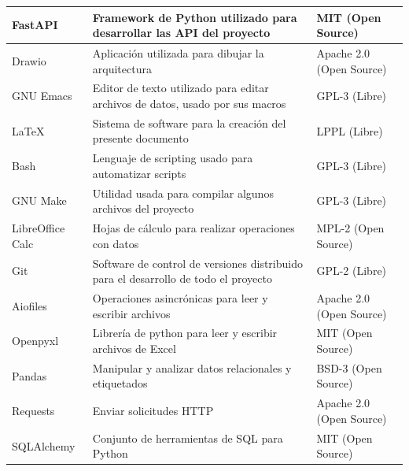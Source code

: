 \begin{longtable}{|p{}|p{}|p{}|}
  FastAPI & Framework de Python utilizado para desarrollar las \acs{API} del proyecto & MIT (Open Source)\cite{fastapi_license} \\ \hline

  Drawio & Aplicación utilizada para dibujar la arquitectura & Apache 2.0 (Open Source)\cite{drawio_license} \\ \hline

  GNU Emacs & Editor de texto utilizado para editar archivos de datos, usado por sus macros & GPL-3 (Libre)\cite{wiki_gnu_emacs} \\ \hline

  \LaTeX & Sistema de software para la creación del presente documento & LPPL (Libre)\cite{latex_lppl} \\ \hline

  Bash & Lenguaje de scripting usado para automatizar scripts & GPL-3 (Libre)\cite{wiki_bash_shell} \\ \hline

  GNU Make & Utilidad usada para compilar algunos archivos del proyecto & GPL-3 (Libre)\cite{gnu_make_manual} \\ \hline

  LibreOffice Calc & Hojas de cálculo para realizar operaciones con datos & MPL-2 (Open Source)\cite{libreoffice_calc} \\ \hline

  Git & Software de control de versiones distribuido para el desarrollo de todo el proyecto & GPL-2 (Libre)\cite{git_about} \\ \hline

  Aiofiles & Operaciones asincrónicas para leer y escribir archivos & Apache 2.0 (Open Source)\cite{aiofiles} \\ \hline

  Openpyxl & Librería de python para leer y escribir archivos de Excel & MIT (Open Source)\cite{openpyxl}  \\ \hline

  Pandas & Manipular y analizar datos relacionales y etiquetados & BSD-3 (Open Source)\cite{pandas} \\ \hline

  Requests & Enviar solicitudes HTTP & Apache 2.0 (Open Source)\cite{psf_requests} \\ \hline

  SQLAlchemy & Conjunto de herramientas de SQL para Python & MIT (Open Source)\cite{sqlalchemy} \\ \hline


\end{longtable}
